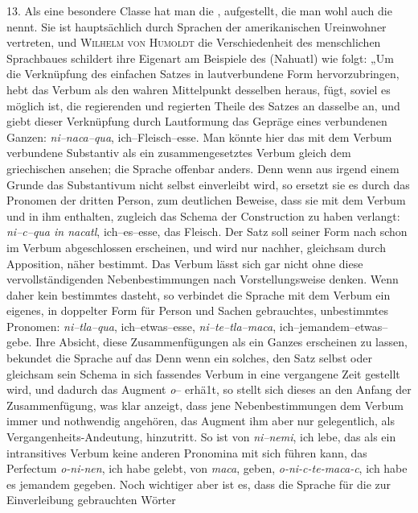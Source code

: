 \largerpage[-1]\label{IV.III.II.4.13}13. Als eine besondere Classe hat man die ,  aufgestellt, die man wohl auch die  nennt. Sie ist hauptsächlich durch Sprachen der amerikanischen Ureinwohner vertreten, und \textsc{Wilhelm von Humoldt}  die Verschiedenheit des menschlichen Sprachbaues  schildert ihre Eigenart am Beispiele des  (Nahuatl) wie folgt: „Um die Verknüpfung des einfachen Satzes in  lautverbundene Form hervorzubringen, hebt  das Verbum als den wahren Mittelpunkt desselben heraus, fügt, soviel es möglich ist, die regierenden und regierten Theile des Satzes an dasselbe an, und giebt dieser Verknüpfung durch Lautformung das Gepräge eines verbundenen Ganzen: \textit{ni–naca–qua}, ich–Fleisch–esse. Man könnte hier das mit dem Verbum verbundene Substantiv als ein zusammengesetztes Verbum gleich dem griechischen  ansehen; \label{sp.355} die Sprache  offenbar anders. Denn wenn aus irgend einem Grunde das Substantivum nicht selbst einverleibt wird, so ersetzt sie es durch das Pronomen der dritten Person, zum deutlichen Beweise, dass sie mit dem Verbum und in ihm enthalten, zugleich das Schema der Construction zu haben verlangt: \textit{ni–c–qua in nacatl}, ich–es–esse, das Fleisch. Der Satz soll seiner Form nach schon im Verbum abgeschlossen erscheinen, und wird nur nachher, gleichsam durch Apposition, näher bestimmt. Das Verbum lässt sich gar nicht ohne diese vervollständigenden Nebenbestimmungen nach  Vorstellungsweise denken. Wenn daher kein bestimmtes  dasteht, so verbindet die Sprache mit dem Verbum ein eigenes, in doppelter Form für Person und Sachen gebrauchtes, unbestimmtes Pronomen: \textit{ni–tla–qua}, ich–etwas–esse, \textit{ni–te–tla–maca}, ich–jemandem–etwas–gebe. Ihre Absicht, diese Zusammenfügungen als ein Ganzes erscheinen zu lassen, bekundet die Sprache auf das  Denn wenn ein solches, den Satz selbst oder gleichsam sein Schema in sich fassendes Verbum in eine vergangene Zeit gestellt wird, und dadurch das Augment \label{fp.337} \textit{o}– erhä1t, so stellt sich dieses an den Anfang der Zusammenfügung, was klar anzeigt, dass jene Nebenbestimmungen dem Verbum immer und nothwendig angehören, das Augment ihm aber nur gelegentlich, als Vergangenheits-Andeutung, hinzutritt. So ist von \textit{ni–nemi}, ich lebe, das als ein intransitives Verbum keine anderen Pronomina mit sich führen  kann, das Perfectum \textit{o-ni-nen}, ich habe gelebt, von \textit{maca}, geben, \textit{o-ni-c-te-maca-c}, ich habe es jemandem gegeben. Noch wichtiger aber ist es, dass die Sprache für die zur Einverleibung gebrauchten Wörter 
